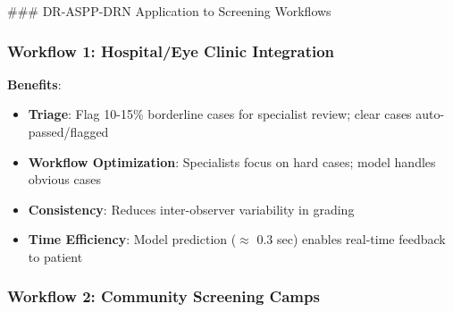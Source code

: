 \documentclass[12pt,a4paper]{article}
\begin{document}
### DR-ASPP-DRN Application to Screening Workflows

\subsubsection{Workflow 1: Hospital/Eye Clinic Integration}

\begin{figure}[H]
\centering
{}
\end{figure}

\textbf{Benefits}:
\begin{itemize}
    \item \textbf{Triage}: Flag 10-15\% borderline cases for specialist review; clear cases auto-passed/flagged
    \item \textbf{Workflow Optimization}: Specialists focus on hard cases; model handles obvious cases
    \item \textbf{Consistency}: Reduces inter-observer variability in grading
    \item \textbf{Time Efficiency}: Model prediction ($\approx$ 0.3 sec) enables real-time feedback to patient
\end{itemize}

\subsubsection{Workflow 2: Community Screening Camps}
\end{document}
